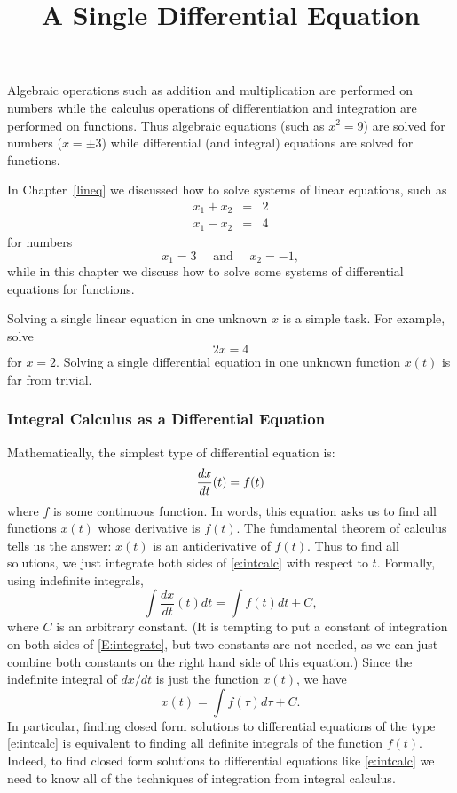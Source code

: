 \documentclass{ximera}
\title{A Single Differential Equation}
\begin{document}
\begin{abstract}
\end{abstract}
\maketitle

  \label{S:growthmodels}

Algebraic operations such as addition and multiplication are
performed on numbers while the calculus operations of
differentiation and integration are performed on functions.
Thus algebraic equations (such as $x^2=9$) are solved for
numbers ($x=\pm 3$) while differential (and integral) equations
are solved for functions.

In Chapter~\ref{lineq} we discussed how to solve systems of
linear equations, such as
\begin{eqnarray*}
x_1 + x_2 & = & 2 \\
x_1 - x_2 & = & 4
\end{eqnarray*}
for numbers
\[
x_1=3 \quad \mbox{ and } \quad x_2=-1,
\]
while in this chapter we discuss how to solve some systems of
differential equations for functions.

Solving a single linear equation in one unknown $x$ is a simple
task.  For example, solve
\[
2x = 4
\]
for $x=2$.  Solving a single differential equation in one unknown function
$x(t)$ is far from trivial.

\subsubsection*{Integral Calculus as a Differential Equation}

Mathematically, the simplest type of differential equation is:
\begin{equation} \label{e:intcalc}
\displaystyle\frac{dx}{dt}(t) = f(t)
\end{equation}
where $f$ is some continuous function.  In words, this equation asks us
to find all functions $x(t)$ whose derivative is $f(t)$.  The fundamental
theorem of calculus tells us the answer: $x(t)$ is an antiderivative of
$f(t)$.  Thus to find all solutions, we just integrate both sides of
\eqref{e:intcalc} with respect to $t$.  Formally, using indefinite integrals, 
\begin{equation}  \label{E:integrate}
\int \frac{dx}{dt}(t)dt = \int f(t)dt + C,
\end{equation}
where $C$ is an arbitrary constant.  (It is tempting to put a constant of
integration on both sides of \eqref{E:integrate}, but two constants are not 
needed, as we can just combine both constants on the right hand side of
this equation.)   Since the indefinite integral of $dx/dt$ is just the
function $x(t)$, we have 
\begin{equation}  \label{e:intcalcsoln}
x(t) = \int f(\tau) d\tau + C.
\end{equation}
In particular, finding closed form solutions to differential equations
of the type \eqref{e:intcalc} is equivalent to finding all definite
integrals of the function $f(t)$.  Indeed, to find closed form solutions 
to differential equations like \eqref{e:intcalc} we need to know all of the 
techniques of integration from integral calculus.
\end{document}
